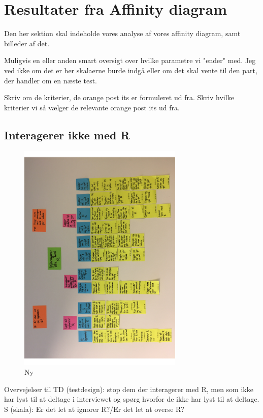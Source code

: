 \section{Resultater fra Affinity diagram}
\label{ParametreDatabehandlingAffinityDiagram}
%
Den her sektion skal indeholde vores analyse af vores affinity diagram, samt billeder af det. 

Muligvis en eller anden smart oversigt over hvilke parametre vi "ender" med. Jeg ved ikke om det er her skalaerne burde indgå eller om det skal vente til den part, der handler om en næste test. 

Skriv om de kriterier, de orange post its er formuleret ud fra. Skriv hvilke kriterier vi så vælger de relevante orange post its ud fra. 

\subsection{Interagerer ikke med R}
%

%
\begin{figure}[H]
\centering
\includegraphics[width = 0.7\textwidth, angle = -90]{Figure/AffinityDiagram/InteragererIkkeMedR} 
\caption{Ny}
\label{fig:AFInteragererIkkeMedR}
\end{figure}
\noindent
%
Overvejelser til TD (testdesign): stop dem der interagerer med R, men som ikke har lyst til at deltage i interviewet og spørg hvorfor de ikke har lyst til at deltage. \\
S (skala): Er det let at ignorer R?/Er det let at overse R?

